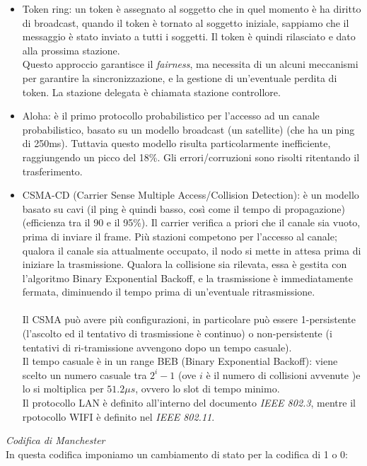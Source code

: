 \documentclass[11pt, oneside]{article}   	%
\begin{document}
\begin{itemize}
\item Token ring: un token è assegnato al soggetto che in quel momento è ha diritto di broadcast, quando il token è tornato al soggetto iniziale, sappiamo che il messaggio è stato inviato a tutti i soggetti. Il token è quindi rilasciato e dato alla prossima stazione. \\
Questo approccio garantisce il \emph{fairness}, ma necessita di un alcuni meccanismi per garantire la sincronizzazione, e la gestione di un'eventuale perdita di token. La stazione delegata è chiamata stazione controllore.
\item Aloha: è il primo protocollo probabilistico per l'accesso ad un canale probabilistico, basato su un modello broadcast (un satellite) (che ha un ping di 250ms). Tuttavia questo modello risulta particolarmente inefficiente, raggiungendo un picco del 18\%. Gli errori/corruzioni sono risolti ritentando il trasferimento. 
\item CSMA-CD (Carrier Sense Multiple Access/Collision Detection): è un modello basato su cavi (il ping è quindi basso, così come il tempo di propagazione)(efficienza tra il 90 e il 95\%). Il carrier verifica a priori che il canale sia vuoto, prima di inviare il frame. Più stazioni competono per l'accesso al canale; qualora il canale sia attualmente occupato, il nodo si mette in attesa prima di iniziare la trasmissione. Qualora la collisione sia rilevata, essa è gestita con l'algoritmo Binary Exponential Backoff, e la trasmissione è immediatamente fermata, diminuendo il tempo prima di un'eventuale ritrasmissione.\\\\
Il CSMA può avere più configurazioni, in particolare può essere 1-persistente (l'ascolto ed il tentativo di trasmissione è continuo) o non-persistente (i tentativi di ri-tramissione avvengono dopo un tempo casuale).\\
Il tempo casuale è in un range BEB (Binary Exponential Backoff): viene scelto un numero casuale tra $2^i-1$ (ove $i$ è il numero di collisioni avvenute )e lo si moltiplica per $51.2\mu s$, ovvero lo slot di tempo minimo.\\
Il protocollo LAN è definito all'interno del documento \emph{IEEE 802.3}, mentre il rpotocollo WIFI è definito nel \emph{IEEE 802.11}.
\end{itemize}
\emph{Codifica di Manchester}\\
In questa codifica imponiamo un cambiamento di stato per la codifica di 1 o 0:
\end{document}
